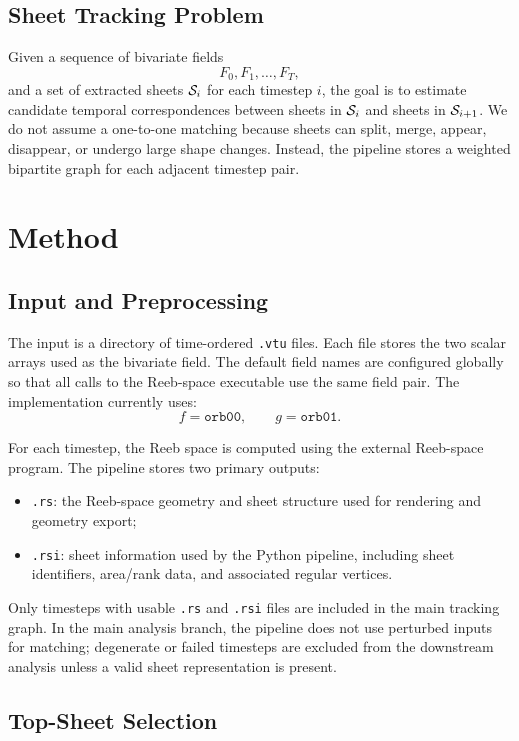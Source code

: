 \subsection{Sheet Tracking Problem}

Given a sequence of bivariate fields
\[
F_0,F_1,\ldots,F_T,
\]
and a set of extracted sheets \(\mathcal{S}_i\) for each timestep \(i\), the goal
is to estimate candidate temporal correspondences between sheets in
\(\mathcal{S}_i\) and sheets in \(\mathcal{S}_{i+1}\). We do not assume a one-to-one
matching because sheets can split, merge, appear, disappear, or undergo large
shape changes. Instead, the pipeline stores a weighted bipartite graph for each
adjacent timestep pair.

\section{Method}

\subsection{Input and Preprocessing}

The input is a directory of time-ordered \texttt{.vtu} files. Each file stores
the two scalar arrays used as the bivariate field. The default field names are
configured globally so that all calls to the Reeb-space executable use the same
field pair. The implementation currently uses:
\[
f=\texttt{orb00}, \qquad g=\texttt{orb01}.
\]

For each timestep, the Reeb space is computed using the external Reeb-space
program. The pipeline stores two primary outputs:
\begin{itemize}
  \item \texttt{.rs}: the Reeb-space geometry and sheet structure used for
  rendering and geometry export;
  \item \texttt{.rsi}: sheet information used by the Python pipeline, including
  sheet identifiers, area/rank data, and associated regular vertices.
\end{itemize}
Only timesteps with usable \texttt{.rs} and \texttt{.rsi} files are included in
the main tracking graph. In the main analysis branch, the pipeline does not use
perturbed inputs for matching; degenerate or failed timesteps are excluded from
the downstream analysis unless a valid sheet representation is present.

\subsection{Top-Sheet Selection}

